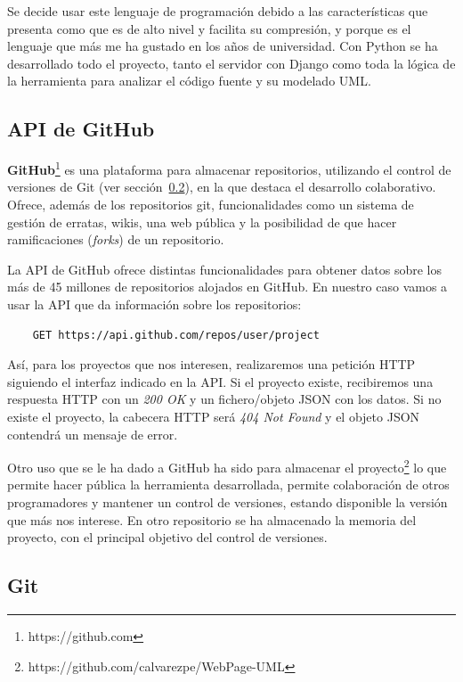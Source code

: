 \documentclass[a4paper, 12pt]{book}
\begin{document}
Se decide usar este lenguaje de programación debido a las características que presenta como que es de alto nivel y facilita su compresión, y porque es el lenguaje que más me ha gustado en los años de universidad. Con Python se ha desarrollado todo el proyecto, tanto el servidor con Django como toda la lógica de la herramienta para analizar el código fuente y su modelado UML.

\subsection{API de GitHub}
\label{subsec:apigithub}
\textbf{GitHub}\footnote{https://github.com} es una plataforma para almacenar repositorios, utilizando el control de versiones de Git (ver sección~\ref{subsec:git}), en la que destaca el desarrollo colaborativo. Ofrece, además de los repositorios git, funcionalidades como un sistema de gestión de erratas, wikis, una web pública y la posibilidad de que hacer ramificaciones (\emph{forks}) de un repositorio.

La API de GitHub ofrece distintas funcionalidades para obtener datos sobre los más de 45 millones de repositorios alojados en GitHub. En nuestro caso vamos a usar la API que da información sobre los repositorios:

  \begin{lstlisting}
    GET https://api.github.com/repos/user/project
  \end{lstlisting}

Así, para los proyectos que nos interesen, realizaremos una petición HTTP siguiendo el interfaz indicado en la API. Si el proyecto existe, recibiremos una respuesta HTTP con un \emph{200 OK} y un fichero/objeto JSON con los datos. Si no existe el proyecto, la cabecera HTTP será \emph{404 Not Found} y el objeto JSON contendrá un mensaje de error.

Otro uso que se le ha dado a GitHub ha sido para almacenar el proyecto\footnote{https://github.com/calvarezpe/WebPage-UML} lo que permite hacer pública la herramienta desarrollada, permite colaboración de otros programadores y mantener un control de versiones, estando disponible la versión que más nos interese. En otro repositorio se ha almacenado la memoria del proyecto, con el principal objetivo del control de versiones.

\subsection{Git}
\label{subsec:git}
\end{document}
